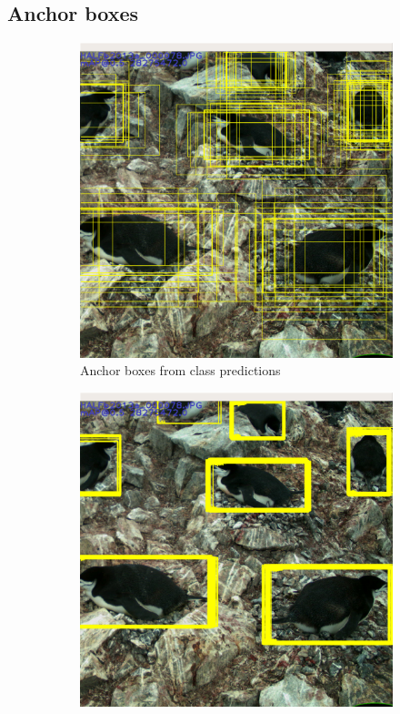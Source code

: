 \subsection{Anchor boxes}

\begin{figure}
  \centering
  \begin{subfigure}[t]{0.33\textwidth}
  \includegraphics[width=0.95\linewidth]{figures/object/anchors.png}
  \caption{Anchor boxes from class predictions}
  \end{subfigure}%
  \begin{subfigure}[t]{0.33\textwidth}
  \includegraphics[width=0.95\linewidth]{figures/object/predictions.png}

\end{subfigure}
\end{figure}

